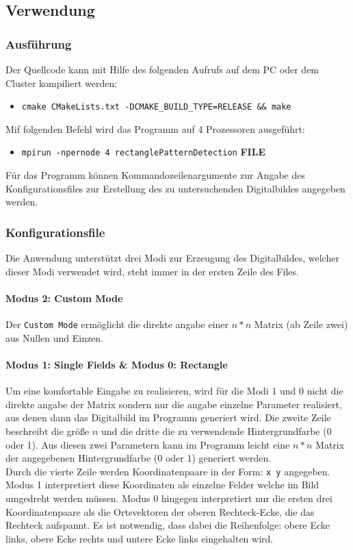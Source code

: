 \subsection{Verwendung}
\subsubsection{Ausführung}
Der Quellcode kann mit Hilfe des folgenden Aufrufs auf dem PC oder dem Cluster kompiliert werden:

\begin{itemize}
	\item \texttt{cmake CMakeLists.txt -DCMAKE\_BUILD\_TYPE=RELEASE \&\& make}
\end{itemize}

Mif folgenden Befehl wird das Programm auf 4 Prozessoren ausgeführt:

\begin{itemize}
	\item \texttt{mpirun -npernode 4 rectanglePatternDetection} \textbf{FILE}
\end{itemize}

Für das Programm können Kommandozeilenargumente zur Angabe des Konfigurationsfiles zur Erstellung des zu untersuchenden Digitalbildes angegeben werden.

\subsubsection{Konfigurationsfile}
Die Anwendung unterstützt drei Modi zur Erzeugung des Digitalbildes, welcher dieser Modi verwendet wird, steht immer in der ersten Zeile des Files.

\paragraph{Modus 2: Custom Mode}Der \texttt{Custom Mode} ermöglicht die direkte angabe einer $n*n$ Matrix (ab Zeile zwei) aus Nullen und Einzen.

\paragraph{Modus 1: Single Fields \& Modus 0: Rectangle}
Um eine komfortable Eingabe zu realisieren, wird für die Modi 1 und 0 nicht die direkte angabe der Matrix sondern nur die angabe einzelne Parameter realisiert, aus denen dann das Digitalbild im Programm generiert wird. Die zweite Zeile beschreibt die größe $n$ und die dritte die zu verwendende Hintergrundfarbe (0 oder 1). Aus diesen zwei Parametern kann im Programm leicht eine $n*n$ Matrix der angegebenen Hintergrundfarbe (0 oder 1) generiert werden. \\
Durch die vierte Zeile werden Koordinatenpaare in der Form: \texttt{x y} angegeben. Modus 1 interpretiert diese Koordinaten als einzelne Felder welche im Bild umgedreht werden müssen. Modus 0 hingegen interpretiert nur die ersten drei Koordinatenpaare als die Ortsvektoren der oberen Rechteck-Ecke, die das Rechteck aufspannt. Es ist notwendig, dass dabei die Reihenfolge: obere Ecke links, obere Ecke rechts und untere Ecke links eingehalten wird.

